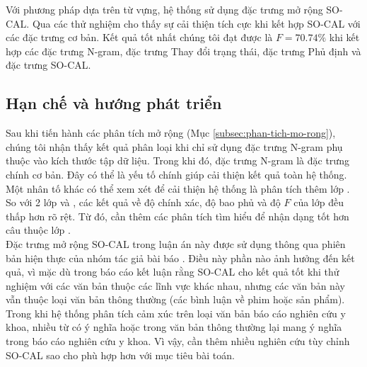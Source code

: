 Với phương pháp dựa trên từ vựng, hệ thống sử dụng đặc trưng mở rộng SO-CAL. Qua các thử nghiệm cho thấy sự cải thiện tích cực khi kết hợp SO-CAL với các đặc trưng cơ bản. Kết quả tốt nhất chúng tôi đạt được là $F=70.74\%$ khi kết hợp các đặc trưng N-gram, đặc trưng Thay đổi trạng thái, đặc trưng Phủ định và đặc trưng SO-CAL.
\subsection{Hạn chế và hướng phát triển}
Sau khi tiến hành các phân tích mở rộng (Mục \ref{subsec:phan-tich-mo-rong}), chúng tôi nhận thấy kết quả phân loại khi chỉ sử dụng đặc trưng N-gram phụ thuộc vào kích thước tập dữ liệu. Trong khi đó, đặc trưng N-gram là đặc trưng chính cơ bản. Đây có thể là yếu tố chính giúp cải thiện kết quả toàn hệ thống. \\

Một nhân tố khác có thể xem xét để cải thiện hệ thống là phân tích thêm lớp \tieucuc. So với 2 lớp \tichcuc và \trungtinh, các kết quả về độ chính xác, độ bao phủ và độ $F$ của lớp \tieucuc đều thấp hơn rõ rệt. Từ đó, cần thêm các phân tích tìm hiểu để nhận dạng tốt hơn câu thuộc lớp \tieucuc.\\

Đặc trưng mở rộng SO-CAL trong luận án này được sử dụng thông qua phiên bản hiện thực của nhóm tác giả bài báo \cite{taboada2011lexicon}. Điều này phần nào ảnh hưởng đến kết quả, vì mặc dù trong báo cáo \cite{taboada2011lexicon} kết luận rằng SO-CAL cho kết quả tốt khi thử nghiệm với các văn bản thuộc các lĩnh vực khác nhau, nhưng các văn bản này vẫn thuộc loại văn bản thông thường (các bình luận về phim hoặc sản phẩm). Trong khi hệ thống phân tích cảm xúc trên loại văn bản báo cáo nghiên cứu y khoa, nhiều từ có ý nghĩa \tieucuc hoặc \trungtinh trong văn bản thông thường lại mang ý nghĩa \tichcuc trong báo cáo nghiên cứu y khoa. Vì vậy, cần thêm nhiều nghiên cứu tùy chỉnh SO-CAL sao cho phù hợp hơn với mục tiêu bài toán.